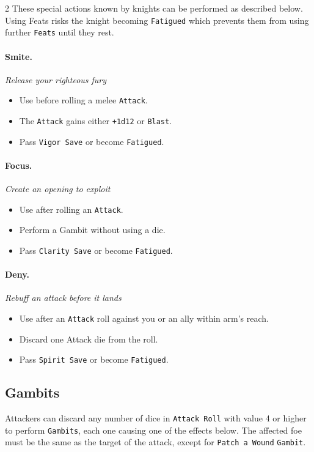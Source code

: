 \documentclass{osr-template/zine}
\begin{document}
\begin{multicols*}{2}
These special actions known by knights can
be performed as described below. Using Feats
risks the knight becoming \texttt{Fatigued} which
prevents them from using further \texttt{Feats} until
they rest.

\paragraph{Smite.} \textit{Release your righteous fury}
\begin{itemize}[nosep]
    \item Use before rolling a melee \texttt{Attack}.
    \item The \texttt{Attack} gains either \texttt{+1d12} or \texttt{Blast}.
    \item Pass \texttt{Vigor Save} or become \texttt{Fatigued}.
\end{itemize}
\paragraph{Focus.} \textit{Create an opening to exploit}
\begin{itemize}[nosep]
    \item Use after rolling an \texttt{Attack}.
    \item Perform a Gambit without using a die.
    \item Pass \texttt{Clarity Save} or become \texttt{Fatigued}.
\end{itemize}

\paragraph{Deny.} \textit{Rebuff an attack before it lands}
\begin{itemize}[nosep]
    \item Use after an \texttt{Attack} roll against you or an ally within arm’s reach.
    \item Discard one Attack die from the roll.
    \item Pass \texttt{Spirit Save} or become \texttt{Fatigued}.
\end{itemize}


\subsection*{Gambits}

Attackers can discard any number of dice in \texttt{Attack Roll} with value 4 or higher to perform \texttt{Gambits}, each one causing one of the effects below.
The affected foe must be the same as the target of the attack, except for \texttt{Patch a Wound} \texttt{Gambit}.


\end{multicols*}
\end{document}
